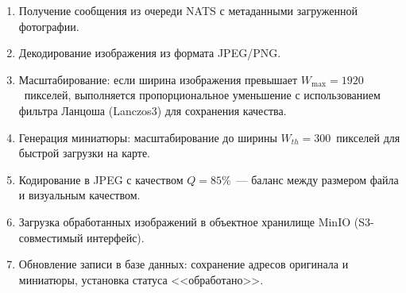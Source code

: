 \begin{enumerate}
  \item Получение сообщения из очереди NATS с метаданными загруженной фотографии.
  \item Декодирование изображения из формата JPEG/PNG.
  \item Масштабирование: если ширина изображения превышает $W_{\max} = 1920$~пикселей, выполняется пропорциональное уменьшение с использованием фильтра Ланцоша (Lanczos3) для сохранения качества.
  \item Генерация миниатюры: масштабирование до ширины $W_{th} = 300$~пикселей для быстрой загрузки на карте.
  \item Кодирование в JPEG с качеством $Q = 85\%$~--- баланс между размером файла и визуальным качеством.
  \item Загрузка обработанных изображений в объектное хранилище MinIO (S3-совместимый интерфейс).
  \item Обновление записи в базе данных: сохранение адресов оригинала и миниатюры, установка статуса <<обработано>>.
\end{enumerate}

